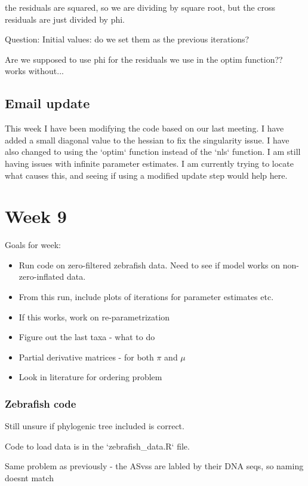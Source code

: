 \documentclass[10pt]{article}
\begin{document}
the residuals are squared, so we are dividing by square root, but the cross residuals are just divided by phi.

Question:
Initial values: do we set them as the previous iterations?


Are we supposed to use phi for the residuals we use in the optim function?? works without...



\subsection{Email update}
This week I have been modifying the code based on our last meeting. I have added a small diagonal value to the hessian to fix the singularity issue. I have also changed to using the `optim` function instead of the `nls` function. I am still having issues with infinite parameter estimates. I am currently trying to locate what causes this, and seeing if using a modified update step would help here. 


\section{Week 9}

Goals for week:
\begin{itemize}
  \item Run code on zero-filtered zebrafish data. Need to see if model works on non-zero-inflated data.
  \item From this run, include plots of iterations for parameter estimates etc.
  \item If this works, work on re-parametrization
  \item Figure out the last taxa - what to do
  \item Partial derivative matrices - for both $\pi$ and $\mu$
  \item Look in literature for ordering problem
\end{itemize}

\subsubsection*{Zebrafish code}

Still unsure if phylogenic tree included is correct.

Code to load data is in the `zebrafish\_data.R` file.

Same problem as previously - the ASvss are labled by their DNA seqs, so naming doesnt match
\end{document}
